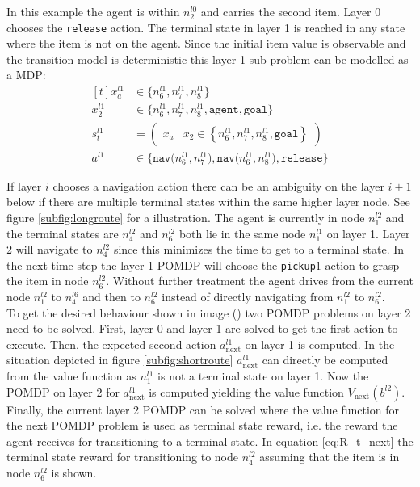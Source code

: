 \begin{example}
In this example the agent is within $n_2^{l0}$ and carries the second item. Layer 0 chooses the \texttt{release} action. The terminal state in layer 1 is reached in any state where the item is not on the agent. Since the initial item value is observable and the transition model is deterministic this layer 1 sub-problem can be modelled as a MDP:
\begin{equation}
    \begin{aligned}[t] 
        x_a^{l1} &\in \big\{ n_6^{l1}, n_7^{l1}, n_8^{l1} \big\} \\
        x_2^{l1} &\in  \big\{ n_6^{l1}, n_7^{l1}, n_8^{l1}, \texttt{agent}, \texttt{goal} \big\}\\
        s_t^{l1} &= \begin{pmatrix} x_a & x_2\in\left\{ n_6^{l1}, n_7^{l1}, n_8^{l1}, \texttt{goal} \right\} \end{pmatrix}\\
        a^{l1} &\in \big\{\texttt{nav($n_6^{l1}, n_7^{l1}$)}, \texttt{nav($n_6^{l1}, n_8^{l1}$)}, \texttt{release} \big\}
        \end{aligned}
\end{equation}
\demo
\end{example}
%
If layer $i$ chooses a navigation action there can be an ambiguity on the layer $i+1$ below if there are multiple terminal states within the same higher layer node. See figure \ref{subfig:longroute} for a illustration. The agent is currently in node $n_1^{l2}$ and the terminal states are $n_4^{l2}$ and $n_6^{l2}$ both lie in the same node $n_1^{l1}$ on layer 1. Layer 2 will navigate to $n_4^{l2}$ since this minimizes the time to get to a terminal state. In the next time step the layer 1 POMDP will choose the \texttt{pickup}$1$ action to grasp the item in node $n_6^{l2}$. Without further treatment the agent drives from the current node $n_1^{l2}$ to $n_4^{l6}$ and then to $n_6^{l2}$ instead of directly navigating from $n_1^{l2}$ to $n_6^{l2}$. \\
To get the desired behaviour shown in image () two POMDP problems on layer 2 need to be solved. First, layer 0 and layer 1 are solved to get the first action to execute. Then, the expected second action $a_\text{next}^{l1}$ on layer 1 is computed. In the situation depicted in figure \ref{subfig:shortroute} $a_\text{next}^{l1}$ can directly be computed from the value function as $n_1^{l1}$ is not a terminal state on layer 1. Now the  POMDP on layer 2 for $a_\text{next}^{l1}$ is computed yielding the value function $V_\text{next}(b^{l2})$. Finally, the current layer 2 POMDP can be solved where the value function for the next POMDP problem is used as terminal state reward, i.e. the reward the agent receives for transitioning to a terminal state. In equation \ref{eq:R_t_next} the terminal state reward for transitioning to node $n_4^{l2}$ assuming that the item is in node $n_6^{l2}$ is shown.
